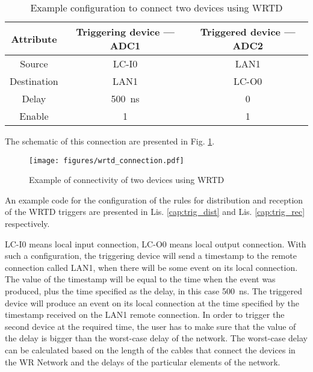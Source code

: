             \begin{table}
            \centering
            \caption{Example configuration to connect two devices using WRTD}
            \begin{tabular}{ccc}
            Attribute & Triggering device --- ADC1 & Triggered device --- ADC2 \\
            \hline
            Source & LC-I0 & LAN1 \\
            Destination & LAN1 & LC-O0 \\
            Delay & 500~ns & 0 \\
            Enable & 1 & 1 \\
            \end{tabular}
            \label{tab:wrtd_example}
            \end{table}
            
            The schematic of this connection are presented in Fig. \ref{fig:wrtd_connection}.
            
            \begin{figure}
            	\centerline{\texttt{[image: figures/wrtd\_connection.pdf]}}
            	\caption{Example of connectivity of two devices using WRTD}
            	\label{fig:wrtd_connection}
            \end{figure}
            
            An example code for the configuration of the rules for distribution and reception of the WRTD triggers are presented in Lis. \ref{cap:trig_dist} and Lis. \ref{cap:trig_rec} respectively.
            
            
            
            LC-I0 means local input connection, LC-O0 means local output connection. With such a configuration, the triggering device will send a timestamp to the remote connection called LAN1, when there will be some event on its local connection. The value of the timestamp will be equal to the time when the event was produced, plus the time specified as the delay, in this case 500~ns. The triggered device will produce an event on its local connection at the time specified by the timestamp received on the LAN1 remote connection. In order to trigger the second device at the required time, the user has to make sure that the value of the delay is bigger than the worst-case delay of the network. The worst-case delay can be calculated based on the length of the cables that connect the devices in the WR Network and the delays of the particular elements of the network. 
        
